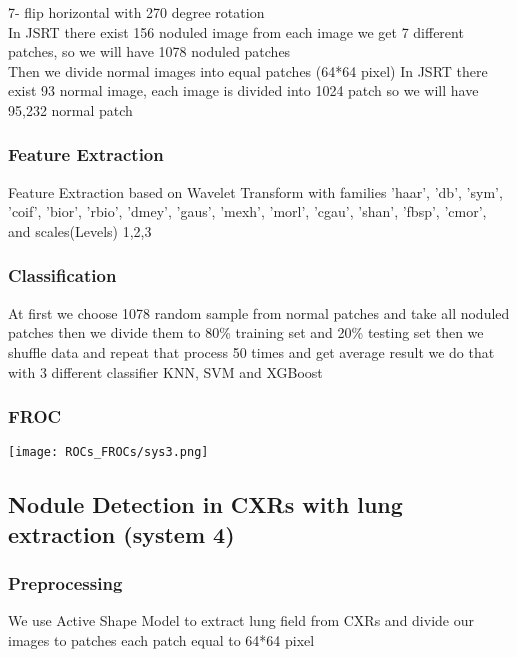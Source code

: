 \documentclass[hidelinks,12pt,xcolor=table]{article}
\begin{document}
\begin{multicols}{2}
7- flip horizontal with 270 degree rotation\\

In JSRT there exist 156 noduled image
from each image we get 7 different patches,
so we will have 1078 noduled patches\\

Then we divide normal images into equal patches (64*64 pixel)
In JSRT there exist 93 normal image, 
each image is divided into 1024 patch
so we will have 95,232 normal patch

\subsubsection{Feature Extraction}
Feature Extraction based on Wavelet Transform with families
'haar', 'db', 'sym', 'coif', 'bior', 'rbio', 'dmey', 'gaus',
'mexh', 'morl', 'cgau', 'shan', 'fbsp', 'cmor',
and scales(Levels) 1,2,3 

\subsubsection{Classification}
At first we choose 1078 random sample from normal patches and take all noduled patches 
then we divide them to 80\% training set and 20\% testing set then we shuffle data and repeat that process 50 times and get average result we do that with 3 different classifier KNN, SVM and XGBoost

\subsubsection{FROC}
\begin{center}
  \centering
  \texttt{[image: ROCs\_FROCs/sys3.png]}
  \label{fig:sys2}
\end{center}



\subsection{Nodule Detection in CXRs with lung extraction (system 4)}
\subsubsection{Preprocessing}
 We use Active Shape Model to extract lung field from CXRs and divide our images to patches each patch equal to 64*64 pixel\\



\end{multicols}
\end{document}
